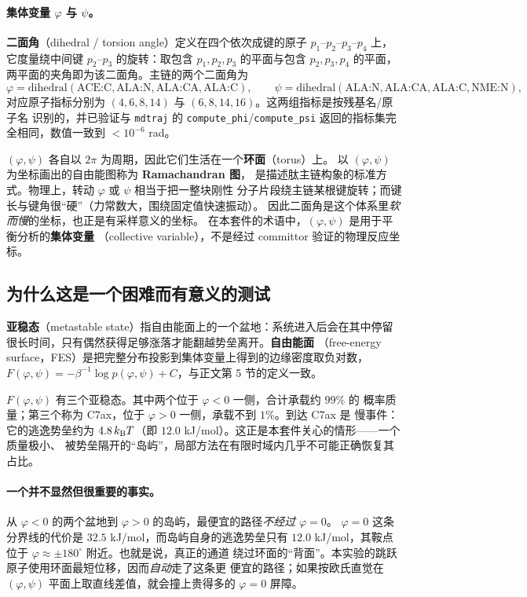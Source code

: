 \documentclass[11pt,a4paper]{article}
\begin{document}
\paragraph{集体变量 $\varphi$ 与 $\psi$。}
\textbf{二面角}（dihedral / torsion angle）定义在四个依次成键的原子 $p_1$--$p_2$--$p_3$--$p_4$
上，它度量绕中间键 $p_2$--$p_3$ 的旋转：取包含 $p_1,p_2,p_3$ 的平面与包含
$p_2,p_3,p_4$ 的平面，两平面的夹角即为该二面角。主链的两个二面角为
\begin{equation}
 \varphi=\mathrm{dihedral}(\text{ACE:C},\text{ALA:N},\text{ALA:CA},\text{ALA:C}),
 \qquad
 \psi=\mathrm{dihedral}(\text{ALA:N},\text{ALA:CA},\text{ALA:C},\text{NME:N}),
\end{equation}
对应原子指标分别为 $(4,6,8,14)$ 与 $(6,8,14,16)$。这两组指标是按残基名/原子名
识别的，并已验证与 \texttt{mdtraj} 的 \texttt{compute\_phi}/\texttt{compute\_psi}
返回的指标集完全相同，数值一致到 $<10^{-6}$ rad。

$(\varphi,\psi)$ 各自以 $2\pi$ 为周期，因此它们生活在一个\textbf{环面}（torus）上。
以 $(\varphi,\psi)$ 为坐标画出的自由能图称为 \textbf{Ramachandran 图}，
是描述肽主链构象的标准方式。物理上，转动 $\varphi$ 或 $\psi$ 相当于把一整块刚性
分子片段绕主链某根键旋转；而键长与键角很“硬”（力常数大，围绕固定值快速振动）。
因此二面角是这个体系里\emph{软而慢}的坐标，也正是有采样意义的坐标。
在本套件的术语中，$(\varphi,\psi)$ 是用于平衡分析的\textbf{集体变量}
（collective variable），不是经过 committor 验证的物理反应坐标。

\subsection{为什么这是一个困难而有意义的测试}

\textbf{亚稳态}（metastable state）指自由能面上的一个盆地：系统进入后会在其中停留
很长时间，只有偶然获得足够涨落才能翻越势垒离开。\textbf{自由能面}
（free-energy surface，FES）是把完整分布投影到集体变量上得到的边缘密度取负对数，
$F(\varphi,\psi)=-\beta^{-1}\log p(\varphi,\psi)+C$，与正文第 5 节的定义一致。

$F(\varphi,\psi)$ 有三个亚稳态。其中两个位于 $\varphi<0$ 一侧，合计承载约 $99\%$ 的
概率质量；第三个称为 C7ax，位于 $\varphi>0$ 一侧，承载不到 $1\%$。到达 C7ax 是
慢事件：它的逃逸势垒约为 $4.8\,k_{\rm B}T$（即 $12.0$ kJ/mol）。这正是本套件关心的情形——一个质量极小、
被势垒隔开的“岛屿”，局部方法在有限时域内几乎不可能正确恢复其占比。

\paragraph{一个并不显然但很重要的事实。}
从 $\varphi<0$ 的两个盆地到 $\varphi>0$ 的岛屿，最便宜的路径\emph{不经过} $\varphi=0$。
$\varphi=0$ 这条分界线的代价是 $32.5$ kJ/mol，而岛屿自身的逃逸势垒只有
$12.0$ kJ/mol，其鞍点位于 $\varphi\approx\pm180^\circ$ 附近。也就是说，真正的通道
绕过环面的“背面”。本实验的跳跃原子使用环面最短位移，因而\emph{自动}走了这条更
便宜的路径；如果按欧氏直觉在 $(\varphi,\psi)$ 平面上取直线差值，就会撞上贵得多的
$\varphi=0$ 屏障。
\end{document}
